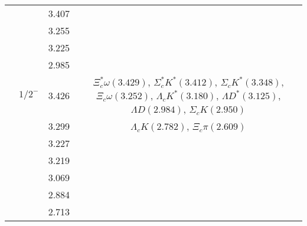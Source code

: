 \documentclass[prd,twocolumn,floatfix,nofootinbib]{revtex4}
\begin{document}
\begin{table*}[!htbp]
\begin{tabular}{cccc}
            &               &3.407  & \\
            &               &3.255  & \\
            &               &3.225  & \\
            &               &2.985  & \\
            &${1/2}^{-}$    &3.426  &$\Xi_{c}^{\ast}\omega(3.429)$, $\Sigma_{c}^{\ast}K^{\ast}(3.412)$, $\Sigma_{c}K^{\ast}(3.348)$, $\Xi_{c}\omega(3.252)$, $\Lambda_{c}K^{\ast}(3.180)$, $\Lambda D^{\ast}(3.125)$, $\Lambda D(2.984)$, $\Sigma_{c}K(2.950)$ \\
            &               &3.299  &$\Lambda_{c}K(2.782)$, $\Xi_{c}\pi(2.609)$ \\
            &               &3.227  & \\
            &               &3.219  & \\
            &               &3.069  & \\
            &               &2.884  & \\
            &               &2.713  & \\
        \hline\hline
    \end{tabular}
\end{table*}
\end{document}
